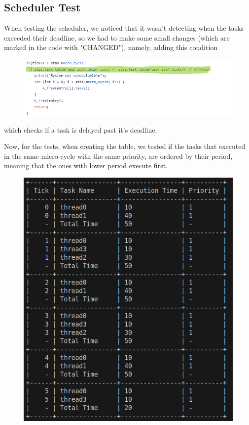 \documentclass[a4paper,12pt]{article}
\begin{document}
\subsection{Scheduler Test}
When testing the scheduler, we noticed that it wasn't detecting when the tasks exceeded their deadline, so we had to make some small changes (which are marked in the code with "CHANGED"), namely, adding this condition
\begin{figure}[H]
    \centering
    \includegraphics[width=0.91\linewidth]{code_change.png}
    \label{fig:code_change}
\end{figure}

which checks if a task is delayed past it's deadline.

Now, for the tests, when creating the table, we tested if the tasks that executed in the same micro-cycle with the same priority, are ordered by their period, meaning that the ones with lower period execute first.
\begin{figure}[H]
    \centering
    \includegraphics[width=0.6\linewidth]{STBS_test_period.png}
    \label{fig:STBS_test_period}
\end{figure}
\end{document}
